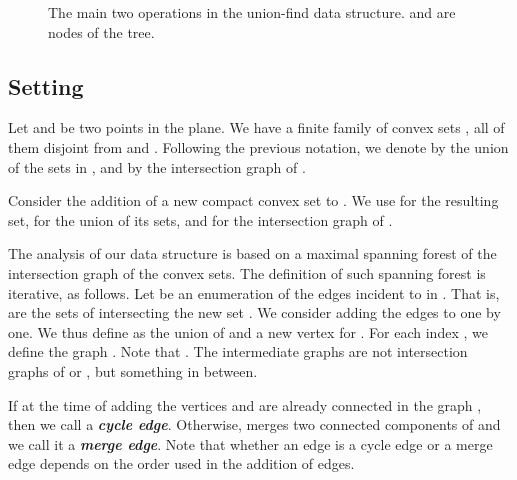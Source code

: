 \documentclass[a4paper,11pt]{article}
\def\find{\mbox{\sc Find}}
\def\union{\mbox{\sc Union}}
\def\DEF#1{\textbf{\emph{#1}}}
\begin{document}
\begin{figure}[htb]
	\hfill
	\ovalbox{
	\parbox{6.6cm}
	{\begin{algorithm}{\find}{}
		\qif  \qthen\\
			
		\qfi\\
		\qreturn 
	\end{algorithm}}}
	\hfill
	\ovalbox{
	\parbox{6.6cm}
	{\begin{algorithm}{\union}{}
		\\
		\\
		\qif  \qthen\\
			
		\qelse (*  *)\\
			\\
			\qif  \qthen\\
				
			\qfi
		\qfi
	\end{algorithm}}}
	\hfill
	\caption{The main two operations in the union-find data structure. 
			 and  are nodes of the tree.}
	\label{fig:code1}
\end{figure}


\subsection{Setting}
\label{sec:setting}
Let  and  be two points in the plane.
We have a finite family of convex sets , all of them disjoint from  and .
Following the previous notation, we denote by  the union of the sets in , 
and by  the intersection graph of .

Consider the addition of a new compact convex set  to . 
We use  for the resulting set,  for the union of its sets,
and  for the intersection graph of .
 
The analysis of our data structure is based on a maximal spanning forest 
of the intersection graph of the convex sets.
The definition of such spanning forest is iterative, as follows.
Let  be an enumeration of the edges incident to  in .
That is,  are the sets of  intersecting the new set .
We consider adding the edges  to  one by one.
We thus define  as the union of  and a new vertex  for .
For each index , we define the graph .
Note that . The intermediate graphs  are not
intersection graphs of  or , but something in between.

If at the time of adding  the vertices  and  are already connected 
in the graph , then we call  a \DEF{cycle edge}.
Otherwise,  merges two connected components of 
and we call it a \DEF{merge edge}.
Note that whether an edge is a cycle edge or a merge edge depends on the order used in the addition of edges.
\end{document}
